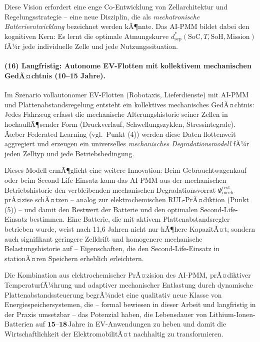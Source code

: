 ﻿\documentclass[12pt,a4paper]{article}
\begin{document}
Diese Vision erfordert eine enge Co-Entwicklung von Zellarchitektur und
Regelungsstrategie -- eine neue Disziplin, die als
\textit{mechatronische Batterieentwicklung} bezeichnet werden kÃ¶nnte.
Das AI-PMM bildet dabei den kognitiven Kern: Es lernt die optimale
Atmungskurve $d_\mathrm{sep}^*(\mathrm{SoC}, T, \mathrm{SoH}, \mathrm{Mission})$
fÃ¼r jede individuelle Zelle und jede Nutzungssituation.

\paragraph{(16) Langfristig: Autonome EV-Flotten mit kollektivem
	mechanischen GedÃ¤chtnis (10--15 Jahre).}
Im Szenario vollautonomer EV-Flotten (Robotaxis, Lieferdienste) mit
AI-PMM und Plattenabstandsregelung entsteht ein kollektives mechanisches
GedÃ¤chtnis: Jedes Fahrzeug erfasst die mechanische Alterungshistorie
seiner Zellen in hochauflÃ¶sender Form (Druckverlauf, Schwellungszyklen,
Stressintegrale). Ãœber Federated Learning (vgl.\ Punkt (4)) werden diese
Daten flottenweit aggregiert und erzeugen ein universelles
\textit{mechanisches Degradationsmodell} fÃ¼r jeden Zelltyp und jede
Betriebsbedingung.

Dieses Modell ermÃ¶glicht eine weitere Innovation: Beim Gebrauchtwagenkauf
oder beim Second-Life-Einsatz kann das AI-PMM aus der mechanischen
Betriebshistorie den verbleibenden mechanischen Degradationsvorrat
$\Psi_\mathrm{mech}^\mathrm{rest}$ prÃ¤zise schÃ¤tzen -- analog zur
elektrochemischen RUL-PrÃ¤diktion (Punkt (5)) -- und damit den Restwert
der Batterie und den optimalen Second-Life-Einsatz bestimmen. Eine
Batterie, die mit aktivem Plattenabstandsregler betrieben wurde, weist
nach 11{,}6 Jahren nicht nur hÃ¶here KapazitÃ¤t, sondern auch signifikant
geringere Zelldrift und homogenere mechanische Belastungshistorie auf --
Eigenschaften, die den Second-Life-Einsatz in stationÃ¤ren Speichern
erheblich erleichtern.

Die Kombination aus elektrochemischer PrÃ¤zision des AI-PMM, prÃ¤diktiver
Temperatur\-fÃ¼h\-rung und adaptiver mechanischer Entlastung durch
dynamische Plattenabstandssteuerung begrÃ¼ndet eine qualitativ neue
Klasse von Energiespeichersystemen, die -- formal bewiesen in dieser
Arbeit und langfristig in der Praxis umsetzbar -- das Potenzial haben,
die Lebensdauer von Lithium-Ionen-Batterien auf
$\mathbf{15\text{--}18\,\mathrm{Jahre}}$ in EV-Anwendungen zu heben
und damit die Wirtschaftlichkeit der ElektromobilitÃ¤t nachhaltig zu
transformieren.
	
\end{document}
